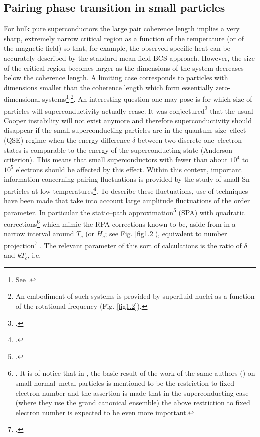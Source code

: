 \subsection{Pairing phase transition in small particles}
For bulk pure superconductors the large pair coherence length implies a very sharp, extremely narrow critical region as a function of the temperature (or of the magnetic field) so that, for example, the observed specific heat can be accurately described by the standard mean field BCS approach. However, the size of the critical region becomes larger as the dimensions of the system decreases below the coherence length. A limiting case corresponds   to particles with dimensions smaller than the coherence length which form essentially zero-dimensional systems\footnote{See \cite{Perenboom:81,Anderson:59,Kubo:62,Kubo:68,Muhlschlegel:72,Lauritzen:93}.}$^{,}$\footnote{An embodiment of such systems is provided by superfluid nuclei as a function of the rotational frequency (Fig. \ref{fig1.2}).}. An interesting question one may pose is for which size of particles will superconductivity actually cease. It was conjectured\footnote{\cite{Anderson:59}.} that the usual Cooper instability will not exist anymore and therefore superconductivity should disappear if the small superconducting particles are in the quantum--size--effect (QSE) regime when the energy difference $\delta$ between two discrete one--electron states is comparable to the energy of the superconducting state (Anderson criterion). This means that small superconductors with fewer than about $10^4$ to $10^5$ electrons should be affected by this effect.
Within this context, important information concerning pairing fluctuations is provided by the study of small Sn-particles at low temperatures\footnote{\cite{Perenboom:81}.}. To describe these fluctuations, use of techniques have been made that take into account large amplitude fluctuations of the order parameter. In particular the static--path approximation\footnote{\cite{Muhlschlegel:72}.} (SPA) with quadratic corrections\footnote{\cite{Lauritzen:93}. It is of notice that in \cite{Muhlschlegel:72}, the basic result of the work of the same authors (\cite{Denton:71}) on small normal--metal particles is mentioned to be the restriction to fixed electron number and the assertion is made that in the superconducting case (where they use the grand canonical ensemble) the above restriction to fixed electron number is expected to be even more important.} which mimic the RPA corrections known to be, aside from in a narrow interval around $T_c$ (or $H_c$; see Fig. \ref{fig1.2}), equivalent to number projection\footnote{\cite{Shimizu:90}.} . The relevant parameter of this sort of calculations is the ratio of $\delta$ and $kT_c$, i.e.
